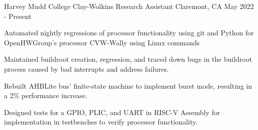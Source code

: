   \begin{cventry}
    {Harvey Mudd College} %
    {Clay-Wolkins Research Assistant} %
    {Claremont, CA} %
    {May 2022 - Present} %
    {
    \begin{cvitems}
      \item {
      Automated nightly regressions of processor functionality using git and Python for OpenHWGroup's processor CVW-Wally using Linux commands
      }
      \item {
      Maintained buildroot creation, regression, and traced down bugs in the buildroot process caused by bad interrupts and address failures.
      }
      \item{
      Rebuilt AHBLite bus' finite-state machine to implement burst mode, resulting in a 2\% performance increase.
      }
      \item{
      Designed tests for a GPIO, PLIC, and UART in RISC-V Assembly for implementation in testbenches to verify processor functionality.
      }
    \end{cvitems}
    }
  \end{cventry}
